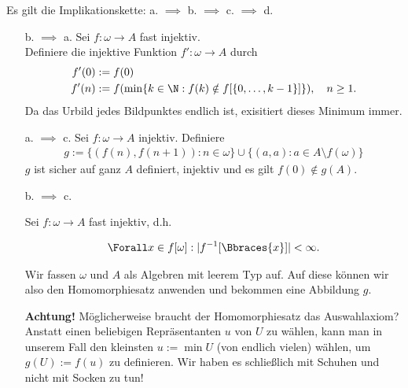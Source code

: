 \begin{solution}

Es gilt die Implikationskette: a. $\implies$ b. $\implies$ c. $\implies$ d.

\begin{itemize}
  \item[b. $\implies$ a.] Sei $f: \omega \to A$ fast injektiv. \\
  Definiere die injektive Funktion $f': \omega \to A$ durch
  \begin{align*}
    f'(0) &:= f(0) \\
    f'(n) &:= f(\min\{k \in  \N:  f(k) \notin f[\{0,\dots,k-1\}]\}), \quad n \geq 1.
  \end{align*}
  Da das Urbild jedes Bildpunktes endlich ist, exisitiert dieses Minimum immer.
  \item[a. $\implies$ c.] Sei $f: \omega \to A$ injektiv.
  Definiere
  \begin{align*}
    g := \{(f(n),f(n+1)): n \in \omega\} \cup \{(a,a): a \in A \setminus f(\omega)\}
  \end{align*}
  $g$ ist sicher auf ganz $A$ definiert, injektiv und es gilt $f(0) \notin g(A)$.
  \item[b. $\implies$ c.]

    Sei $f: \omega \to A$ fast injektiv, d.h.

    \begin{align*}
      \Forall x \in f[\omega]:
      |f^{-1}[\Bbraces{x}]| < \infty.
    \end{align*}

    Wir fassen $\omega$ und $A$ als Algebren mit leerem Typ auf.
    Auf diese können wir also den Homomorphiesatz anwenden und bekommen eine Abbildung $g$.

    \textbf{Achtung!}
    Möglicherweise braucht der Homomorphiesatz das Auswahlaxiom?
    Anstatt einen beliebigen Repräsentanten $u$ von $U$ zu wählen, kann man in unserem Fall den kleinsten $u := \min U$ (von endlich vielen) wählen, um $g(U) := f(u)$ zu definieren.
    Wir haben es schließlich mit Schuhen und nicht mit Socken zu tun!

    \phantom{}



\end{itemize}
\end{solution}
